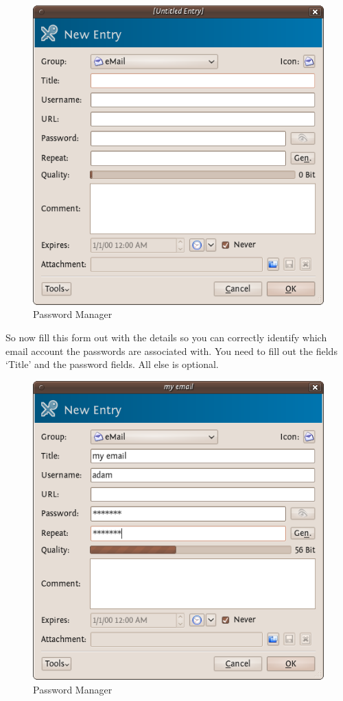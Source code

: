\begin{figure}[htbp]
\centering
\includegraphics{mng_4.png}
\caption{Password Manager}
\end{figure}

So now fill this form out with the details so you can correctly identify
which email account the passwords are associated with. You need to fill
out the fields `Title' and the password fields. All else is optional.

\begin{figure}[htbp]
\centering
\includegraphics{mng_5.png}
\caption{Password Manager}
\end{figure}

